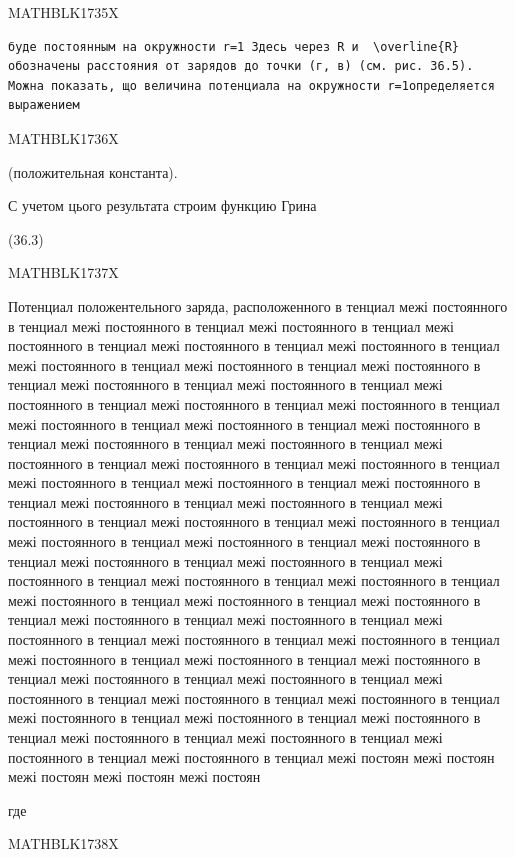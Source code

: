 \documentclass[
  ukrainian,
]{article}
\begin{document}
MATHBLK1735X

\begin{verbatim}
буде постоянным на окружности r=1 Здесь через R и  \overline{R}  обозначены расстояния от зарядов до точки (г, в) (см. рис. 36.5). Можна показать, що величина потенциала на окружности r=1определяется выражением
\end{verbatim}

MATHBLK1736X

(положительная константа).

С учетом цього результата строим функцию Грина

(36.3)

MATHBLK1737X

Потенциал положентельного заряда, расположенного в тенциал межі
постоянного в тенциал межі постоянного в тенциал межі постоянного в
тенциал межі постоянного в тенциал межі постоянного в тенциал межі
постоянного в тенциал межі постоянного в тенциал межі постоянного в
тенциал межі постоянного в тенциал межі постоянного в тенциал межі
постоянного в тенциал межі постоянного в тенциал межі постоянного в
тенциал межі постоянного в тенциал межі постоянного в тенциал межі
постоянного в тенциал межі постоянного в тенциал межі постоянного в
тенциал межі постоянного в тенциал межі постоянного в тенциал межі
постоянного в тенциал межі постоянного в тенциал межі постоянного в
тенциал межі постоянного в тенциал межі постоянного в тенциал межі
постоянного в тенциал межі постоянного в тенциал межі постоянного в
тенциал межі постоянного в тенциал межі постоянного в тенциал межі
постоянного в тенциал межі постоянного в тенциал межі постоянного в
тенциал межі постоянного в тенциал межі постоянного в тенциал межі
постоянного в тенциал межі постоянного в тенциал межі постоянного в
тенциал межі постоянного в тенциал межі постоянного в тенциал межі
постоянного в тенциал межі постоянного в тенциал межі постоянного в
тенциал межі постоянного в тенциал межі постоянного в тенциал межі
постоянного в тенциал межі постоянного в тенциал межі постоянного в
тенциал межі постоянного в тенциал межі постоянного в тенциал межі
постоянного в тенциал межі постоянного в тенциал межі постоянного в
тенциал межі постоянного в тенциал межі постоянного в тенциал межі
постоянного в тенциал межі постоянного в тенциал межі постоянного в
тенциал межі постоянного в тенциал межі постоянного в тенциал межі
постоянного в тенциал межі постоян межі постоян межі постоян межі
постоян межі постоян

где

MATHBLK1738X
\end{document}
